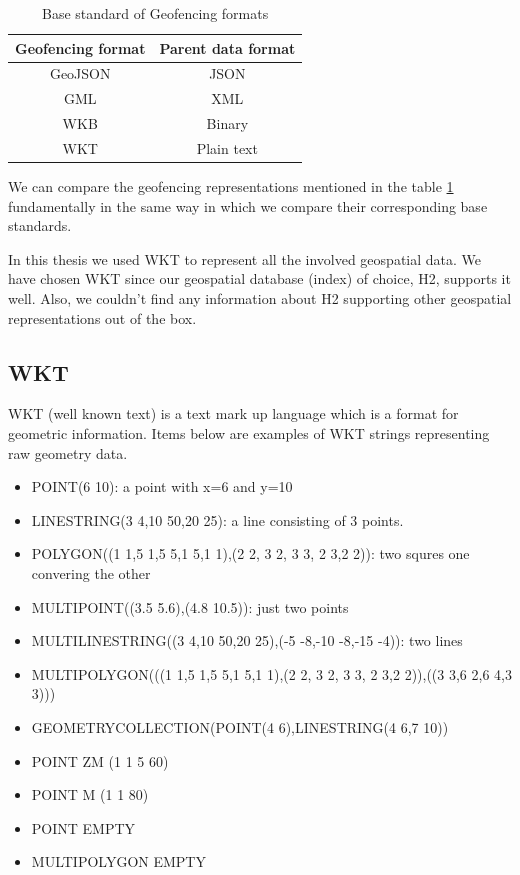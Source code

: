 \documentclass[a4]{report}
\begin{document}
    \begin{table}[h!]
        \centering
        \begin{tabular}{|c|c|}
            \hline
            Geofencing format & Parent data format \\
            \hline
            GeoJSON           & JSON               \\
            GML               & XML                \\
            WKB               & Binary             \\
            WKT               & Plain text         \\
            \hline
        \end{tabular}
        \caption{Base standard of Geofencing formats}
        \label{table:geofencing-formats}
    \end{table}

    We can compare the geofencing representations mentioned in the table \ref{table:geofencing-formats} fundamentally
    in the same way in which we compare their corresponding base standards.

    In this thesis we used WKT to represent all the involved geospatial data.
    We have chosen WKT since our geospatial database (index) of choice, H2, supports it well.
    Also, we couldn't find any information about H2 supporting other geospatial representations out of the box.

    \subsection{WKT}
    WKT (well known text) is a text mark up language which is a format for geometric information.
    Items below are examples of WKT strings representing raw geometry data.
    \begin{itemize}
        \item POINT(6 10): a point with x=6 and y=10
        \item LINESTRING(3 4,10 50,20 25): a line consisting of 3 points.
        \item POLYGON((1 1,5 1,5 5,1 5,1 1),(2 2, 3 2, 3 3, 2 3,2 2)): two squres one convering the other
        \item MULTIPOINT((3.5 5.6),(4.8 10.5)): just two points
        \item MULTILINESTRING((3 4,10 50,20 25),(-5 -8,-10 -8,-15 -4)): two lines
        \item MULTIPOLYGON(((1 1,5 1,5 5,1 5,1 1),(2 2, 3 2, 3 3, 2 3,2 2)),((3 3,6 2,6 4,3 3)))
        \item GEOMETRYCOLLECTION(POINT(4 6),LINESTRING(4 6,7 10))
        \item POINT ZM (1 1 5 60)
        \item POINT M (1 1 80)
        \item POINT EMPTY
        \item MULTIPOLYGON EMPTY
    \end{itemize}
\end{document}
